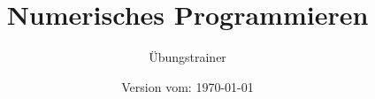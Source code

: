\documentclass[handout,xcolor=dvipsnames, aspectratio=169]{beamer}
\title{\huge Numerisches Programmieren}
\subtitle{Übungstrainer}
\author{\npauthor{}}
\date{Version vom: \today}
\institute{\href{\npauthorurl}{\npauthorurltext}}
\begin{document}
	
	\maketitle
	
	
	\firsttoc
	
	
	
	
	
	
	
	
	
	
	
	
	
	
	
	
\end{document}
